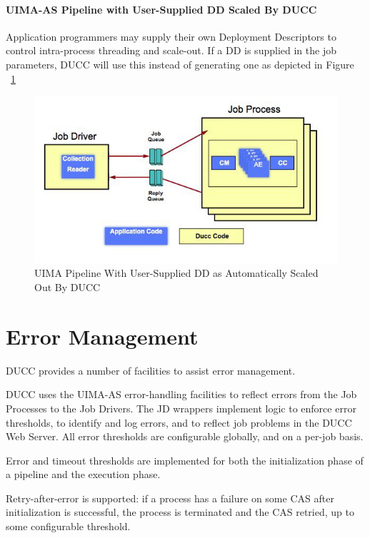     \paragraph{UIMA-AS Pipeline with User-Supplied DD Scaled By DUCC}

    Application programmers may supply their own Deployment Descriptors to control intra-process
    threading and scale-out.  If a DD is supplied in the job parameters, DUCC will use this instead
    of generating one as depicted in Figure ~\ref{UIMA-AS-pipeline-DUCC-DD}

    \begin{figure}[H]
      \centering
      \includegraphics[bb=0 0 571 316,width=5.5in]{images/ducc-parallel.jpg}
      \caption{UIMA Pipeline With User-Supplied DD as Automatically Scaled Out By DUCC}
      \label{UIMA-AS-pipeline-DUCC-DD}
    \end{figure}

  
    \section{Error Management }
    DUCC provides a number of facilities to assist error management.

    DUCC uses the UIMA-AS error-handling facilities to reflect errors from the Job Processes to the
    Job Drivers. The JD wrappers implement logic to enforce error thresholds, to identify and log errors,
    and to reflect job problems in the DUCC Web Server.  All error thresholds are
    configurable globally, and on a per-job basis.

    Error and timeout thresholds are implemented for both the initialization phase of a pipeline
    and the execution phase.
    
    Retry-after-error is supported: if a process has a failure on some CAS after initialization
    is successful, the process is terminated and the CAS retried, up to some configurable threshold.

